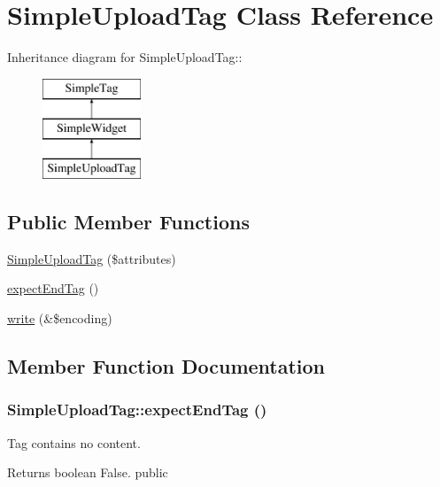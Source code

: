 \hypertarget{class_simple_upload_tag}{
\section{SimpleUploadTag Class Reference}
\label{class_simple_upload_tag}
}
Inheritance diagram for SimpleUploadTag::\begin{figure}[H]
\begin{center}
\leavevmode
\includegraphics[height=3cm]{class_simple_upload_tag}
\end{center}
\end{figure}
\subsection*{Public Member Functions}
\begin{DoxyCompactItemize}
\item 
\hyperlink{class_simple_upload_tag_ac5cdee40b873170a2efce4be218a6a2e}{SimpleUploadTag} (\$attributes)
\item 
\hyperlink{class_simple_upload_tag_a86d768fcbd19fdb1bf8437d304f06fb7}{expectEndTag} ()
\item 
\hyperlink{class_simple_upload_tag_a0d75761c4b47163eff52715789037595}{write} (\&\$encoding)
\end{DoxyCompactItemize}


\subsection{Member Function Documentation}
\hypertarget{class_simple_upload_tag_a86d768fcbd19fdb1bf8437d304f06fb7}{
\subsubsection[{expectEndTag}]{\setlength{\rightskip}{0pt plus 5cm}SimpleUploadTag::expectEndTag ()}}
\label{class_simple_upload_tag_a86d768fcbd19fdb1bf8437d304f06fb7}
Tag contains no content. \begin{DoxyReturn}{Returns}
boolean False.  public 
\end{DoxyReturn}


